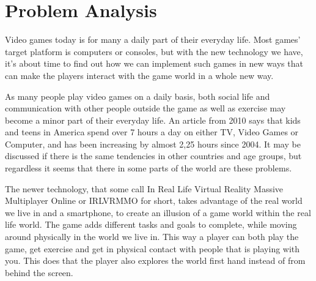 \section{Problem Analysis}

Video games today is for many a daily part of their everyday life. Most games' target platform is computers or consoles, but with the new technology we have, it's about time to find out how we can implement such games in new ways that can make the players interact with the game world in a whole new way. 

As many people play video games on a daily basis, both social life and communication with other people outside the game as well as exercise may become a minor part of their everyday life. An article from 2010\cite{latimes} says that kids and teens in America spend over 7 hours a day on either TV, Video Games or Computer, and has been increasing by almost 2,25 hours since 2004. It may be discussed if there is the same tendencies in other countries and age groups, but regardless it seems that there in some parts of the world are these problems.

The newer technology, that some call In Real Life Virtual Reality Massive Multiplayer Online or IRLVRMMO for short, takes advantage of the real world we live in and a smartphone, to create an illusion of a game world within the real life world. The game adds  different tasks and goals to complete, while moving around physically in the world we live in. This way a player can both play the game, get exercise and get in physical contact with people that is playing with you. This does that the player also explores the world first hand instead of from behind the screen.